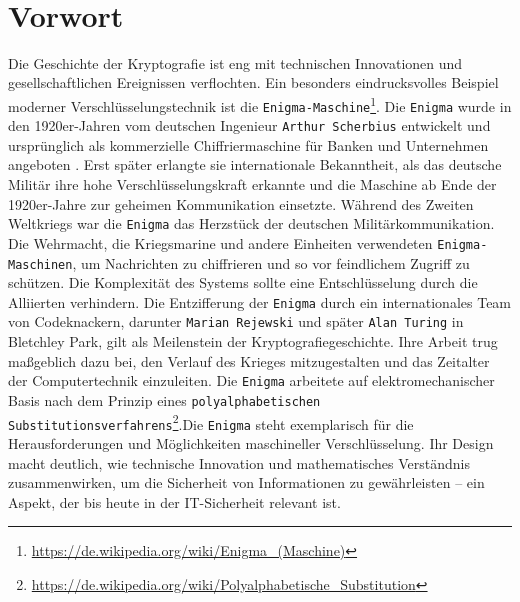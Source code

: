 \documentclass[a4paper,12pt]{scrartcl}
\begin{document}
\iftitlepage
  
  \maketitle

  \thispagestyle{empty}
  \newpage

  \ifblankpageaftertitlepage
    ~
    \thispagestyle{empty}
    \newpage
  \fi
\fi

\ifcompetencepage
  

  \thispagestyle{empty}
  \newpage
\fi

\ifobjectivepage
  

  \thispagestyle{empty}
  \newpage
\fi

\ifhintspage
  

  \thispagestyle{empty}
  \newpage
\fi

\ifsoftwarepage
  

  \thispagestyle{empty}
  \newpage
\fi

\section*{Vorwort}
Die Geschichte der Kryptografie ist eng mit technischen Innovationen und gesellschaftlichen Ereignissen verflochten. Ein besonders eindrucksvolles Beispiel moderner Verschlüsselungstechnik ist die \texttt{Enigma-Maschine}\footnote{\url{https://de.wikipedia.org/wiki/Enigma_(Maschine)}}. Die \texttt{Enigma} wurde in den 1920er-Jahren vom deutschen Ingenieur \texttt{Arthur Scherbius} entwickelt und ursprünglich als kommerzielle Chiffriermaschine für Banken und Unternehmen angeboten \parencite{copeland2017}. Erst später erlangte sie internationale Bekanntheit, als das deutsche Militär ihre hohe Verschlüsselungskraft erkannte und die Maschine ab Ende der 1920er-Jahre zur geheimen Kommunikation einsetzte. Während des Zweiten Weltkriegs war die \texttt{Enigma} das Herzstück der deutschen Militärkommunikation. Die Wehrmacht, die Kriegsmarine und andere Einheiten verwendeten \texttt{Enigma-Maschinen}, um Nachrichten zu chiffrieren und so vor feindlichem Zugriff zu schützen. Die Komplexität des Systems sollte eine Entschlüsselung durch die Alliierten verhindern. Die Entzifferung der \texttt{Enigma} durch ein internationales Team von Codeknackern, darunter \texttt{Marian Rejewski} und später \texttt{Alan Turing} in Bletchley Park, gilt als Meilenstein der Kryptografiegeschichte. Ihre Arbeit trug maßgeblich dazu bei, den Verlauf des Krieges mitzugestalten und das Zeitalter der Computertechnik einzuleiten. Die \texttt{Enigma} arbeitete auf elektromechanischer Basis nach dem Prinzip eines \texttt{polyalphabetischen Substitutionsverfahrens}\footnote{\url{https://de.wikipedia.org/wiki/Polyalphabetische_Substitution}}.Die \texttt{Enigma} steht exemplarisch für die Herausforderungen und Möglichkeiten maschineller Verschlüsselung. Ihr Design macht deutlich, wie technische Innovation und mathematisches Verständnis zusammenwirken, um die Sicherheit von Informationen zu gewährleisten – ein Aspekt, der bis heute in der IT-Sicherheit relevant ist.
\end{document}

